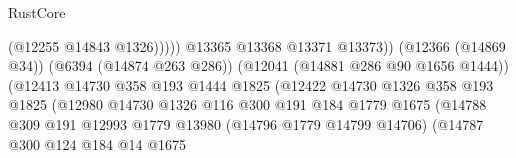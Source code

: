 \begin{lexlean}{RustCore}
\begin{coremodule}
                                                            (@12255 @14843 @1326)))))
                                                    @13365
                                                    @13368
                                                    @13371
                                                    @13373))
                                                (@12366 (@14869 @34))
                                                (@6394 (@14874 @263 @286))
                                                (@12041 (@14881 @286 @90 @1656 @1444))
                                                (@12413
                                                  @14730
                                                  @358
                                                  @193
                                                  @1444
                                                  @1825
                                                  (@12422
                                                    @14730
                                                    @1326
                                                    @358
                                                    @193
                                                    @1825
                                                    (@12980
                                                      @14730
                                                      @1326
                                                      @116
                                                      @300
                                                      @191
                                                      @184
                                                      @1779
                                                      @1675
                                                      (@14788
                                                        @309
                                                        @191
                                                        @12993
                                                        @1779
                                                        @13980
                                                        (@14796 @1779 @14799 @14706)
                                                        (@14787
                                                          @300
                                                          @124
                                                          @184
                                                          @14
                                                          @1675

\end{coremodule}
\end{lexlean}
